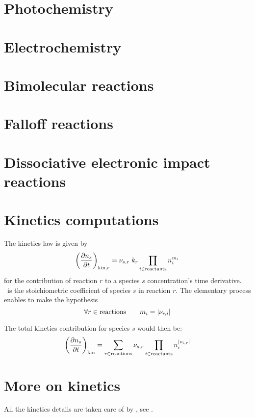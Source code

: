 \section{Photochemistry}


\section{Electrochemistry}


\section{Bimolecular reactions}
\label{Titan_bimol_sec}


\section{Falloff reactions}


\section{Dissociative electronic impact reactions}


\section{Kinetics computations}
The kinetics law is given by
\begin{equation}
\left(\frac{\partial n_s}{\partial t}\right)_{\text{kin},r} = {\nu_{s,r}}\; k_{r} \prod_{i\in\text{reactants}}n_i^{{m_{i}}}
\end{equation}
for the contribution of reaction $r$ to a species $s$ concentration's
time derivative. \ is the stoichiometric coefficient of species
$s$ in reaction $r$. The elementary process enables to make the hypothesis
\begin{equation}
\forall r \in \text{reactions}\qquad
{m_{i}} = |{\nu_{r,i}}|
\end{equation}

The total kinetics contribution for species $s$ would then be:
\begin{equation}
\left(\frac{\partial n_s}{\partial t}\right)_\text{kin} = \sum_{r\in \text{reactions}} {\nu_{s,r}} \prod_{i\in\text{reactants}}n_i^{|{\nu_{i,r}}|}
\end{equation}

\section{More on kinetics}
All the kinetics details are taken
care of by \Antioch, see \GitAntioch.
